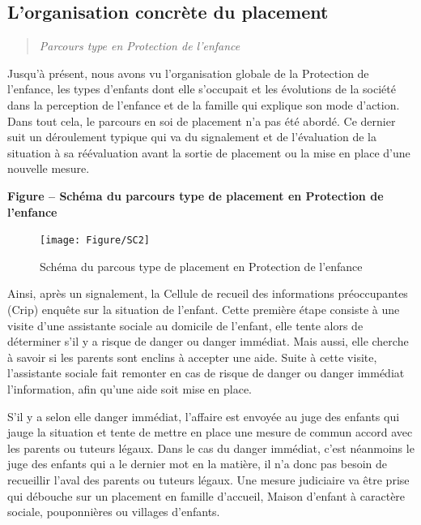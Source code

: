 \documentclass[
  12,
  a4paper,
]{report}
\begin{document}
\hypertarget{lorganisation-concruxe8te-du-placement}{%
\subsection{L'organisation concrète du
placement}\label{lorganisation-concruxe8te-du-placement}}

\begin{quote}
\emph{Parcours type en Protection de l'enfance}
\end{quote}

Jusqu'à présent, nous avons vu l'organisation globale de la Protection
de l'enfance, les types d'enfants dont elle s'occupait et les évolutions
de la société dans la perception de l'enfance et de la famille qui
explique son mode d'action. Dans tout cela, le parcours en soi de
placement n'a pas été abordé. Ce dernier suit un déroulement typique qui
va du signalement et de l'évaluation de la situation à sa réévaluation
avant la sortie de placement ou la mise en place d'une nouvelle mesure.

\textbf{Figure -- Schéma du parcours type de placement en Protection de
l'enfance}

\begin{figure}

{\centering \texttt{[image: Figure/SC2]} 

}

\caption{Schéma du parcous type de placement en Protection de l'enfance}\label{fig:unnamed-chunk-9}
\end{figure}

Ainsi, après un signalement, la Cellule de recueil des informations
préoccupantes (Crip) enquête sur la situation de l'enfant. Cette
première étape consiste à une visite d'une assistante sociale au
domicile de l'enfant, elle tente alors de déterminer s'il y a risque de
danger ou danger immédiat. Mais aussi, elle cherche à savoir si les
parents sont enclins à accepter une aide. Suite à cette visite,
l'assistante sociale fait remonter en cas de risque de danger ou danger
immédiat l'information, afin qu'une aide soit mise en place.

S'il y a selon elle danger immédiat, l'affaire est envoyée au juge des
enfants qui jauge la situation et tente de mettre en place une mesure de
commun accord avec les parents ou tuteurs légaux. Dans le cas du danger
immédiat, c'est néanmoins le juge des enfants qui a le dernier mot en la
matière, il n'a donc pas besoin de recueillir l'aval des parents ou
tuteurs légaux. Une mesure judiciaire va être prise qui débouche sur un
placement en famille d'accueil, Maison d'enfant à caractère sociale,
pouponnières ou villages d'enfants.
\end{document}
